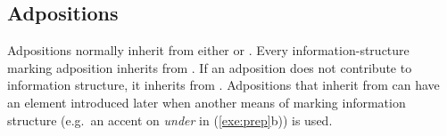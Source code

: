 


\subsection{Adpositions}
\label{10:ssec:adpositions}


Adpositions normally inherit from either 
or . Every
information-structure marking adposition inherits from
.  If an adposition does not contribute to
information structure, it inherits from .
Adpositions that inherit from  can have an
 element introduced later when another means of marking
information structure (e.g.\ an accent on \textit{under} in
(\ref{exe:prep}b)) is used.






